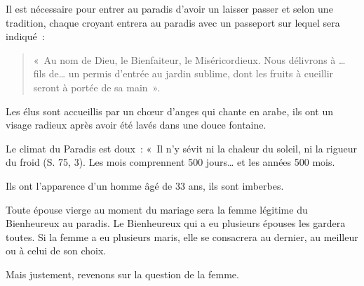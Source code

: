 Il est nécessaire pour entrer au paradis d'avoir un laisser passer et
selon une tradition, chaque croyant entrera au paradis avec un passeport
sur lequel sera indiqué~: 
\begin{quote}
    «~Au nom de Dieu, le Bienfaiteur, le
Miséricordieux. Nous délivrons à \ldots{} fils de\ldots{} un permis
d'entrée au jardin sublime, dont les fruits à cueillir seront à portée
de sa main~».
\end{quote}

Les élus sont accueillis par un chœur d'anges qui chante en arabe, ils
ont un visage radieux après avoir été lavés dans une douce fontaine.

Le climat du Paradis est doux~: «~Il n'y sévit ni la chaleur du soleil,
ni la rigueur du froid (S. 75, 3). Les mois comprennent 500
jours\ldots{} et les années 500 mois.


Ils ont l'apparence d'un homme âgé de 33 ans, ils sont imberbes.

Toute épouse vierge au moment du mariage sera la femme légitime du
Bienheureux au paradis. Le Bienheureux qui a eu plusieurs épouses les
gardera toutes. Si la femme a eu plusieurs maris, elle se consacrera au
dernier, au meilleur ou à celui de son choix.


Mais justement, revenons sur la question de la femme.

